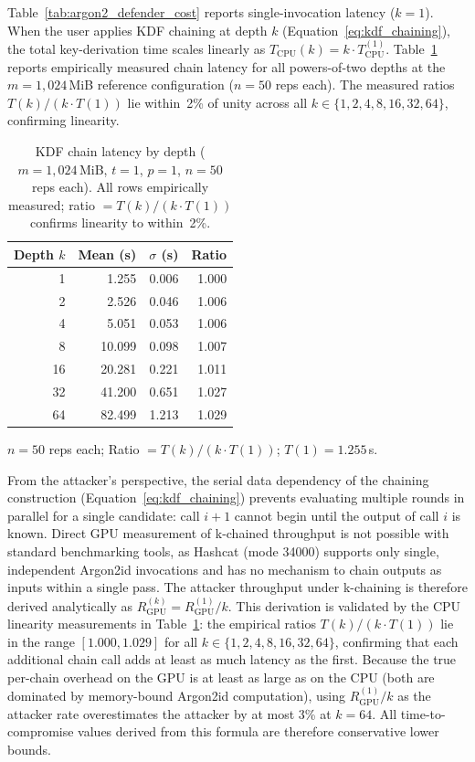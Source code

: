 \documentclass[journal,article,submit,pdftex,moreauthors]{Definitions/mdpi}
\newcommand{\add}[1]{#1}
\newcommand{\add}[1]{\added{#1}}
\begin{document}
\add{Table~\ref{tab:argon2_defender_cost} reports single-invocation latency ($k=1$). When the user applies KDF chaining at depth $k$ (Equation~\ref{eq:kdf_chaining}), the total key-derivation time scales linearly as $T_\text{CPU}(k) = k \cdot T_\text{CPU}^{(1)}$. Table~\ref{tab:kchain_empirical} reports empirically measured chain latency for all powers-of-two depths at the $m=1{,}024$\,MiB reference configuration ($n=50$ reps each). The measured ratios $T(k)/(k\cdot T(1))$ lie within~2\% of unity across all $k\in\{1,2,4,8,16,32,64\}$, confirming linearity.}

\begin{table}[H]
\caption{\add{KDF chain latency by depth ($m=1{,}024$\,MiB, $t=1$, $p=1$, $n=50$ reps each). All rows empirically measured; ratio $= T(k)/(k\cdot T(1))$ confirms linearity to within~2\%.}}
\label{tab:kchain_empirical}
\centering
\begin{minipage}{0.55\linewidth}
\centering
\begin{tabular}{rrrr}
\toprule
\textbf{Depth $k$} & \textbf{Mean (s)} & \textbf{$\sigma$ (s)} & \textbf{Ratio} \\
\midrule
 1 &  1.255 & 0.006 & 1.000 \\
 2 &  2.526 & 0.046 & 1.006 \\
 4 &  5.051 & 0.053 & 1.006 \\
 8 & 10.099 & 0.098 & 1.007 \\
16 & 20.281 & 0.221 & 1.011 \\
32 & 41.200 & 0.651 & 1.027 \\
64 & 82.499 & 1.213 & 1.029 \\
\bottomrule
\end{tabular}
\par\smallskip
{\footnotesize $n=50$ reps each; Ratio $= T(k)/(k\cdot T(1))$; $T(1)=1.255$\,s.}
\end{minipage}
\end{table}

\add{From the attacker's perspective, the serial data dependency of the chaining construction (Equation~\ref{eq:kdf_chaining}) prevents evaluating multiple rounds in parallel for a single candidate: call $i+1$ cannot begin until the output of call $i$ is known. Direct GPU measurement of k-chained throughput is not possible with standard benchmarking tools, as Hashcat (mode 34000) supports only single, independent Argon2id invocations and has no mechanism to chain outputs as inputs within a single pass. The attacker throughput under k-chaining is therefore derived analytically as $R_\text{GPU}^{(k)} = R_\text{GPU}^{(1)} / k$. This derivation is validated by the CPU linearity measurements in Table~\ref{tab:kchain_empirical}: the empirical ratios $T(k)/(k \cdot T(1))$ lie in the range $[1.000, 1.029]$ for all $k \in \{1,2,4,8,16,32,64\}$, confirming that each additional chain call adds at least as much latency as the first. Because the true per-chain overhead on the GPU is at least as large as on the CPU (both are dominated by memory-bound Argon2id computation), using $R_\text{GPU}^{(1)}/k$ as the attacker rate overestimates the attacker by at most 3\% at $k=64$. All time-to-compromise values derived from this formula are therefore conservative lower bounds.}
\end{document}
